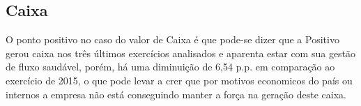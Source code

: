 
\subsection{Caixa}
O ponto positivo no caso do valor de Caixa é que pode-se dizer que a Positivo gerou caixa nos três últimos exercícios analisados e aparenta estar com sua gestão de fluxo saudável, porém, há uma diminuição de 6,54 p.p. em comparação ao exercício de 2015, o que pode levar a crer que por motivos economicos do país ou internos a empresa não está conseguindo manter a força na geração deste caixa.

